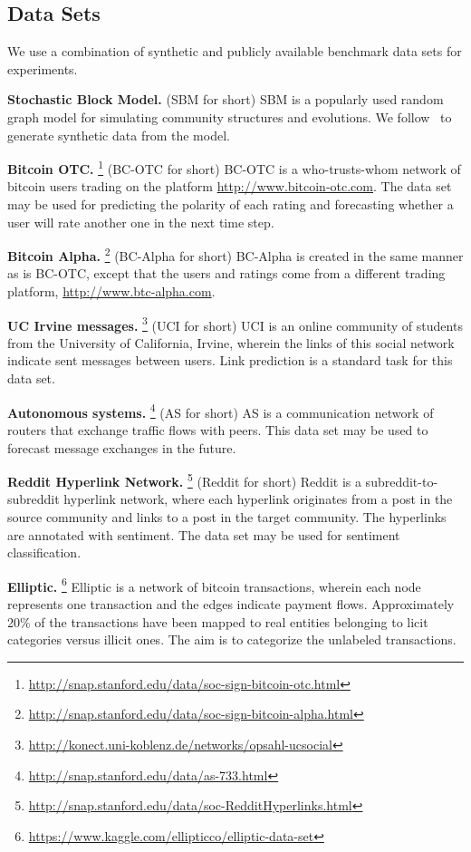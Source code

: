 \documentclass[letterpaper]{article} %
\begin{document}
\subsection{Data Sets}
We use a combination of synthetic and publicly available benchmark data sets for experiments.

\vskip5pt \noindent
\textbf{Stochastic Block Model.}
(SBM for short)
SBM is a popularly used random graph model for simulating community structures and evolutions. We follow~\cite{Goyal2017} to generate synthetic data from the model.

\vskip5pt \noindent
\textbf{Bitcoin OTC.}%
\footnote{\url{http://snap.stanford.edu/data/soc-sign-bitcoin-otc.html}}
(BC-OTC for short)
BC-OTC is a who-trusts-whom network of bitcoin users trading on the platform \url{http://www.bitcoin-otc.com}. The data set may be used for predicting the polarity of each rating and forecasting whether a user will rate another one in the next time step.

\vskip5pt \noindent
\textbf{Bitcoin Alpha.}%
\footnote{\url{http://snap.stanford.edu/data/soc-sign-bitcoin-alpha.html}}
(BC-Alpha for short)
BC-Alpha is created in the same manner as is BC-OTC, except that the users and ratings come from a different trading platform, \url{http://www.btc-alpha.com}.

\vskip5pt \noindent
\textbf{UC Irvine messages.}%
\footnote{\url{http://konect.uni-koblenz.de/networks/opsahl-ucsocial}}
(UCI for short)
UCI is an online community of students from the University of California, Irvine, wherein the links of this social network indicate sent messages between users. Link prediction is a standard task for this data set.

\vskip5pt \noindent
\textbf{Autonomous systems.}%
\footnote{\url{http://snap.stanford.edu/data/as-733.html}}
(AS for short)
AS is a communication network of routers that exchange traffic flows with peers. This data set may be used to forecast message exchanges in the future.

\vskip5pt \noindent
\textbf{Reddit Hyperlink Network.}%
\footnote{\url{http://snap.stanford.edu/data/soc-RedditHyperlinks.html}}
(Reddit for short)
Reddit is a subreddit-to-subreddit hyperlink network, where each hyperlink originates from a post in the source community and links to a post in the target community. The hyperlinks are annotated with sentiment. The data set may be used for sentiment classification.

\vskip5pt \noindent
\textbf{Elliptic.}%
\footnote{\url{https://www.kaggle.com/ellipticco/elliptic-data-set}}
Elliptic is a network of bitcoin transactions, wherein each node represents one transaction and the edges indicate payment flows. Approximately 20\% of the transactions have been mapped to real entities belonging to licit categories versus illicit ones. The aim is to categorize the unlabeled transactions.
\end{document}
